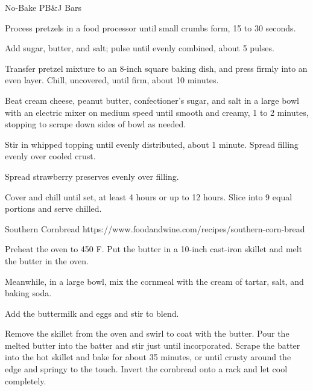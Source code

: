 \documentclass[letterpaper]{book}
\begin{document}
\begin{recipe}{No-Bake PB\&J Bars}{}{}

    Process pretzels in a food processor until small crumbs form, 15 to 30 seconds.

    Add sugar, butter, and salt; pulse until evenly combined, about 5 pulses.

    \newstep

    Transfer pretzel mixture to an 8-inch square baking dish, and press firmly into an even layer.
    Chill, uncovered, until firm, about 10 minutes.


    Beat cream cheese, peanut butter, confectioner's sugar, and salt in a large bowl with an electric mixer on medium speed until smooth and creamy, 1 to 2 minutes, stopping to scrape down sides of bowl as needed.


    Stir in whipped topping until evenly distributed, about 1 minute. Spread filling evenly over cooled crust.


    Spread strawberry preserves evenly over filling.

    \newstep

    Cover and chill until set, at least 4 hours or up to 12 hours. Slice into 9 equal portions and serve chilled.

\end{recipe}

\begin{recipe}{Southern Cornbread}{}{}
    https://www.foodandwine.com/recipes/southern-corn-bread


    Preheat the oven to 450\0 F.
    Put the butter in a 10-inch cast-iron skillet and melt the butter in the oven.



    Meanwhile, in a large bowl, mix the cornmeal with the cream of tartar, salt, and baking soda.


    Add the buttermilk and eggs and stir to blend.

    \newstep

    Remove the skillet from the oven and swirl to coat with the butter. Pour the melted butter into the batter and stir just until incorporated. Scrape the batter into the hot skillet and bake for about 35 minutes, or until crusty around the edge and springy to the touch. Invert the cornbread onto a rack and let cool completely.
\end{recipe}
\end{document}
